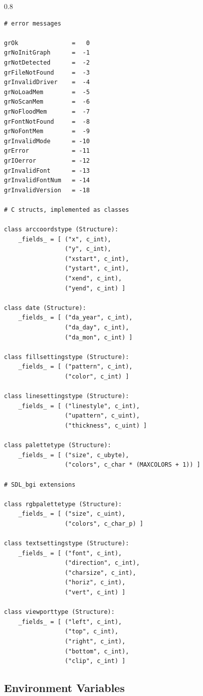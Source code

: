 \documentclass[a4paper,12pt]{article}
\newenvironment{margins}[2]
{ %
\begin{list}{}
{
\setlength{\leftmargin}{#1}
\setlength{\rightmargin}{#2}
} \item
} %
{\end{list}}
\begin{document}
\begin{margins}{-0.5cm}{-0.5cm}
\begin{spacing}{0.8}
\begin{lstlisting}
# error messages

grOk               =   0
grNoInitGraph      =  -1
grNotDetected      =  -2
grFileNotFound     =  -3
grInvalidDriver    =  -4
grNoLoadMem        =  -5
grNoScanMem        =  -6
grNoFloodMem       =  -7
grFontNotFound     =  -8
grNoFontMem        =  -9
grInvalidMode      = -10
grError            = -11
grIOerror          = -12
grInvalidFont      = -13
grInvalidFontNum   = -14
grInvalidVersion   = -18

# C structs, implemented as classes

class arccoordstype (Structure):
    _fields_ = [ ("x", c_int),
                 ("y", c_int),
                 ("xstart", c_int),
                 ("ystart", c_int),
                 ("xend", c_int),
                 ("yend", c_int) ]

class date (Structure):
    _fields_ = [ ("da_year", c_int),
                 ("da_day", c_int),
                 ("da_mon", c_int) ]

class fillsettingstype (Structure):
    _fields_ = [ ("pattern", c_int),
                 ("color", c_int) ]

class linesettingstype (Structure):
    _fields_ = [ ("linestyle", c_int),
                 ("upattern", c_uint),
                 ("thickness", c_uint) ]

class palettetype (Structure):
    _fields_ = [ ("size", c_ubyte),
                 ("colors", c_char * (MAXCOLORS + 1)) ]

# SDL_bgi extensions

class rgbpalettetype (Structure):
    _fields_ = [ ("size", c_uint),
                 ("colors", c_char_p) ]

class textsettingstype (Structure):
    _fields_ = [ ("font", c_int),
                 ("direction", c_int),
                 ("charsize", c_int),
                 ("horiz", c_int),
                 ("vert", c_int) ]

class viewporttype (Structure):
    _fields_ = [ ("left", c_int),
                 ("top", c_int),
                 ("right", c_int),
                 ("bottom", c_int),
                 ("clip", c_int) ]
\end{lstlisting}
\end{spacing}

\end{margins}


\subsection{Environment Variables}
\end{document}
